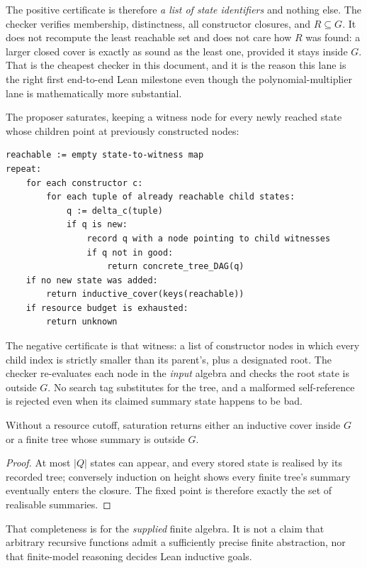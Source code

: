 The positive certificate is therefore \emph{a list of state identifiers} and
nothing else. The checker verifies membership, distinctness, all constructor
closures, and $R\subseteq G$. It does not recompute the least reachable set and
does not care how $R$ was found: a larger closed cover is exactly as sound as
the least one, provided it stays inside $G$. That is the cheapest checker in
this document, and it is the reason this lane is the right first end-to-end
Lean milestone even though the polynomial-multiplier lane is mathematically
more substantial.

The proposer saturates, keeping a witness node for every newly reached state
whose children point at previously constructed nodes:

\begin{lstlisting}
reachable := empty state-to-witness map
repeat:
    for each constructor c:
        for each tuple of already reachable child states:
            q := delta_c(tuple)
            if q is new:
                record q with a node pointing to child witnesses
                if q not in good:
                    return concrete_tree_DAG(q)
    if no new state was added:
        return inductive_cover(keys(reachable))
    if resource budget is exhausted:
        return unknown
\end{lstlisting}

The negative certificate is that witness: a list of constructor nodes in which
every child index is strictly smaller than its parent's, plus a designated root.
The checker re-evaluates each node in the \emph{input} algebra and checks the
root state is outside $G$. No search tag substitutes for the tree, and a
malformed self-reference is rejected even when its claimed summary state happens
to be bad.

\begin{theorem}
Without a resource cutoff, saturation returns either an inductive cover inside
$G$ or a finite tree whose summary is outside $G$.
\end{theorem}
\begin{proof}
At most $|Q|$ states can appear, and every stored state is realised by its
recorded tree; conversely induction on height shows every finite tree's summary
eventually enters the closure. The fixed point is therefore exactly the set of
realisable summaries.
\end{proof}

That completeness is for the \emph{supplied} finite algebra. It is not a claim
that arbitrary recursive functions admit a sufficiently precise finite
abstraction, nor that finite-model reasoning decides Lean inductive goals.

